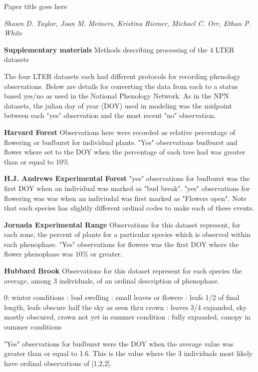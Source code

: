 \documentclass[a4paper,12pt]{article}
\begin{document}
\begin{center}
{\huge Paper title goes here \par} \newline

\textit{Shawn D. Taylor, Joan M. Meiners, Kristina Riemer, Michael C. Orr, Ethan P. White} \newline

{\Large \textbf{Supplementary materials}} \newline
Methods describing processing of the 4 LTER datasets
\end{center}

The four LTER datasets each had different protocols for recording phenology observations. Below are details for converting the data from each to a status based yes/no as used in the National Phenology Network. As in the NPN datasets, the julian day of year (DOY) used in modeling was the midpoint between each "yes" observation and the most recent "no" observation. 

\textbf{Harvard Forest} \newline
Observations here were recorded as relative percentage of flowering or budburst for individual plants. "Yes" observations budburst and flower where set to the DOY when the percentage of each tree had was greater than or equal to 10\%

\textbf{H.J. Andrews Experimental Forest} \newline
"yes" observations for budburst was the first DOY when an individual was marked as "bud break". "yes" observations for flowering was was when an indiviudal was first marked as "Flowers open". Note that each species has slightly different ordinal codes to make each of these events. 

\textbf{Jornada Experimental Range} \newline
Observations for this dataset represent, for each zone, the percent of plants for a particular species which is observed within each phenophase. "Yes" observations for flowers was the first DOY where the flower phenophase was 10\% or greater.

\textbf{Hubbard Brook} \newline
Observations for this dataset represent for each species the average, among 3 individuals, of an ordinal description of phenophase. \newline

0: winter conditions : bud swelling : small leaves or flowers : leafs 1/2 of final length, leafs obscure half the sky as seen thru crown : leaves 3/4 expanded, sky mostly obscured, crown not yet in summer condition : fully expanded, canopy in summer conditions \newline

"Yes" observations for budburst were the DOY when the average value was greater than or equal to 1.6. This is the value where the 3 individuals most likely have ordinal observations of [1,2,2].
\end{document}
